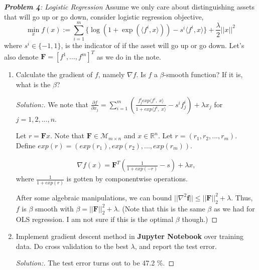 \documentclass[a4paper,11pt,reqno]{amsart}
\theoremstyle{plain}
\theoremstyle{definition}
\theoremstyle{remark}
\numberwithin{equation}{section}
\begin{document}
\vskip 16pt \noindent
{\it \textbf{Problem 4}: Logistic Regression}
\vskip 8pt
Assume we only care about distinguishing assets that will go up or go down, consider logistic regression objective,
\[
\min_{x} f(x):= \sum_{i=1}^m\{\log(1 + \exp(\langle f^i,x \rangle)) - s^i\langle f^i,x \rangle\} + \frac{\lambda}{2}||x||^2
\]
where $s^i\in\{-1,1\}$, is the indicator of if the asset will go up or go down. Let's also denote $\mathbf{F} = [f^1, \ldots, f^m]^T$ as we do in the note.
\vskip 8pt
\begin{enumerate}
\item Calculate the gradient of $f$, namely $\nabla f$. Is $f$ a $\beta$-smooth function? If it is, what is the $\beta$?
\begin{proof}[Solution:]
We note that $\frac{\partial f}{\partial x_j} =  \sum_{i = 1}^m \left(\frac{f^i_j exp \langle f^i,\; x \rangle}{1 + exp \langle f^i,\;x \rangle} - s^i f^i_j \right) + \lambda x_j$ for $j = 1, 2,...,n$.


Let $r = \mathbf{F}x$. Note that $\mathbf{F} \in \mathcal{M}_{m \times n}$ and $x \in \mathbb{R}^n$. Let $r = (r_1, r_2, ..., r_m)$. Define $exp(r) = (exp(r_1), exp(r_2),...,exp(r_m))$.

\begin{align}
\nabla f(x)  = \mathbf{F}^T \left(\frac{1}{1 + exp(-r)} - s\right) + \lambda x,
\end{align}
where $\frac{1}{1 + exp(r)}$ is gotten by componentwise operations. 

After some algebraic manipulations, we can bound $|| \nabla ^  2 \mathbf{f}|| \leq ||\mathbf{F}||_2^2 + \lambda$. 
Thus, $f$ is $\beta $ smooth with $\beta =  ||\mathbf{F}||_2^2 + \lambda$. (Note that this is the same $\beta$ as we had for OLS regression. I am not sure if this is the optimal $\beta$ though.)

\end{proof}

\vskip 16pt
\item Implement gradient descent method in \textbf{Jupyter Notebook} over training data.
Do cross validation to the best $\lambda$, and report the test error.

\begin{proof}[Solution:]The test error turns out to be 47.2 \%.\end{proof}
\end{enumerate}
\end{document}
